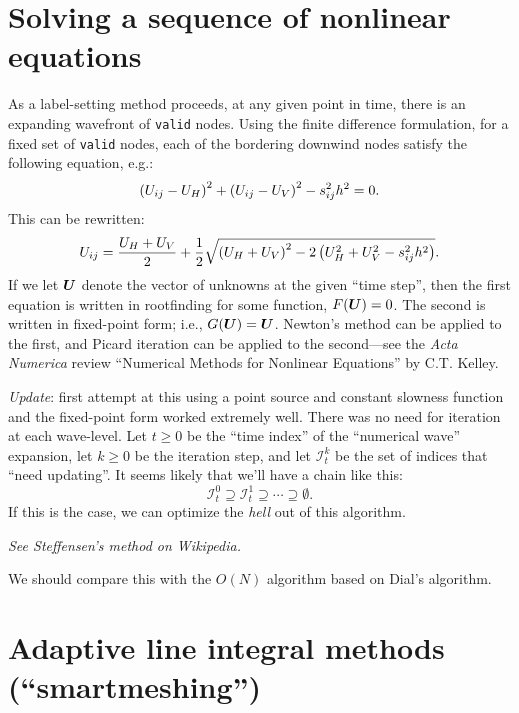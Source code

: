 \documentclass[eikonal.tex]{subfiles}
\begin{document}
\section{Solving a sequence of nonlinear equations}

As a label-setting method proceeds, at any given point in time, there
is an expanding wavefront of \texttt{valid} nodes. Using the finite
difference formulation, for a fixed set of \texttt{valid} nodes, each
of the bordering downwind nodes satisfy the following equation, e.g.:
\begin{equation}
  \left(U_{ij} - U_H\right)^2 + \left(U_{ij} - U_V\right)^2 - s_{ij}^2 h^2 = 0.
\end{equation}
This can be rewritten:
\begin{equation}
  U_{ij} = \frac{U_H + U_V}{2} + \frac{1}{2} \sqrt{\left(U_H + U_V\right)^2 - 2\left(U_H^2 + U_V^2 - s_{ij}^2 h^2\right)}.
\end{equation}
If we let $\boldsymbol{U}$ denote the vector of unknowns at the given ``time
step'', then the first equation is written in rootfinding for some
function, $F(\boldsymbol{U}) = 0$. The second is written in fixed-point form;
i.e., $G(\boldsymbol{U}) = \boldsymbol{U}$. Newton's method can be applied to the first,
and Picard iteration can be applied to the second---see the \emph{Acta
  Numerica} review ``Numerical Methods for Nonlinear Equations'' by
C.T. Kelley.

\emph{Update}: first attempt at this using a point source and constant
slowness function and the fixed-point form worked extremely well. There
was no need for iteration at each wave-level. Let $t \geq 0$ be the
``time index'' of the ``numerical wave'' expansion, let $k \geq 0$ be
the iteration step, and let $\mathcal{I}_t^k$ be the set of indices
that ``need updating''. It seems likely that we'll have a chain like
this:
\begin{equation}
  \mathcal{I}_t^0 \supseteq \mathcal{I}_t^1 \supseteq \cdots \supseteq \emptyset.
\end{equation}
If this is the case, we can optimize the \emph{hell} out of this
algorithm.

\emph{See Steffensen's method on Wikipedia.}

We should compare this with the $O(N)$ algorithm based on Dial's
algorithm.

\section{Adaptive line integral methods (``smartmeshing'')}
\end{document}
